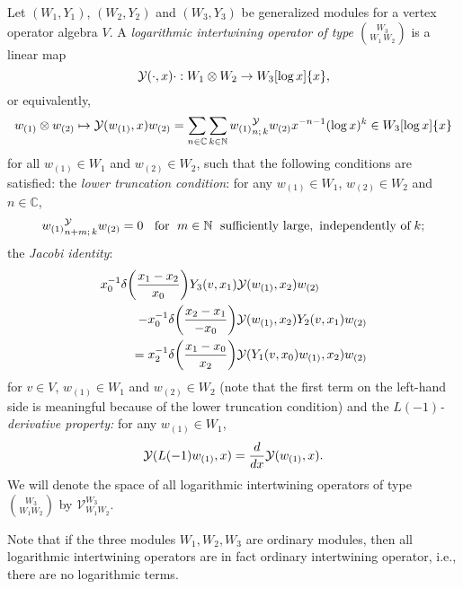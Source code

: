 \documentclass[12pt]{article}
\begin{document}
\begin{defn}\label{log:def}{\rm
Let $(W_1,Y_1)$, $(W_2,Y_2)$ and $(W_3,Y_3)$ be generalized modules
for a vertex operator algebra $V$. A {\em logarithmic
intertwining operator of type $\binom{W_3}{W_1\,W_2}$} is a linear map
\begin{equation*}
{\cal Y}(\cdot, x)\cdot: W_1\otimes W_2\to W_3[\log x]\{x\},
\end{equation*}
or equivalently,
\begin{equation*}
w_{(1)}\otimes w_{(2)}\mapsto{\cal Y}(w_{(1)},x)w_{(2)}=\sum_{n\in {\mathbb
C}}\sum_{k\in {\mathbb N}}{w_{(1)}}_{n;\,k}^{\cal Y}w_{(2)}x^{-n-1}(\log
x)^k\in W_3[\log x]\{x\}
\end{equation*}
for all $w_{(1)}\in W_1$ and $w_{(2)}\in W_2$, such that the following
conditions are satisfied: the {\em lower truncation condition}: for
any $w_{(1)}\in W_1$, $w_{(2)}\in W_2$ and $n\in {\mathbb C}$,
\begin{equation*}
{w_{(1)}}_{n+m;\,k}^{\cal Y}w_{(2)}=0\;\;\mbox{ for }\;m\in {\mathbb N}
\;\mbox{ sufficiently large,\, independently of}\;k;
\end{equation*}
the {\em Jacobi identity}:
\begin{eqnarray}\label{log:jacobi}
  \lefteqn{\dps x^{-1}_0\delta \bigg( \frac{x_1-x_2}{x_0}\bigg)
Y_3(v,x_1){\cal Y}(w_{(1)},x_2)w_{(2)}}\nn
&&\hspace{2em}- x^{-1}_0\delta \bigg( \frac{x_2-x_1}{-x_0}\bigg)
{\cal Y}(w_{(1)},x_2)Y_2(v,x_1)w_{(2)}\nn 
&&{\dps = x^{-1}_2\delta \bigg( \frac{x_1-x_0}{x_2}\bigg) {\cal
Y}(Y_1(v,x_0)w_{(1)},x_2) w_{(2)}}
\end{eqnarray}
for $v\in V$, $w_{(1)}\in W_1$ and $w_{(2)}\in W_2$ (note that the
first term on the left-hand side is meaningful because of
the lower truncation condition) and the {\em $L(-1)$-derivative property:}
for any
$w_{(1)}\in W_1$,
\begin{equation*}
{\cal Y}(L(-1)w_{(1)},x)=\frac d{dx}{\cal Y}(w_{(1)},x).
\end{equation*}
We will denote the space of all logarithmic intertwining operators
of type $\binom{W_3}{W_1W_2}$ by $\mathcal V_{W_1W_2}^{W_3}$.
}
\end{defn}
Note that if the three modules $W_1, W_2, W_3$ are ordinary modules, then
all logarithmic intertwining operators are in fact ordinary intertwining
operator, i.e., there are no logarithmic terms.
\end{document}
